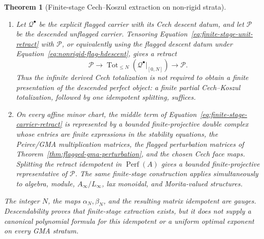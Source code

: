 \documentclass[11pt]{article}
\newtheorem{theorem}{Theorem}[section]
\theoremstyle{definition}
\begin{document}
\begin{theorem}[Finite-stage Cech--Koszul extraction on non-rigid strata]
\begin{enumerate}[label=\textnormal{(\roman*)}]
\item Let $\mathcal Q^\bullet$ be the explicit flagged carrier with its Cech
descent datum, and let $\mathcal P$ be the descended unflagged carrier.  Tensoring
Equation~\eqref{eq:finite-stage-unit-retract} with $\mathcal P$, or equivalently
using the flagged descent datum under
Equation~\eqref{eq:nonrigid-flag-hdescent}, gives a retract
\begin{equation}\label{eq:finite-stage-carrier-retract}
 \mathcal P
 \longrightarrow
 \operatorname{Tot}_{\le N}
 \left(\mathcal Q^\bullet|_{[0,N]}\right)
 \longrightarrow
 \mathcal P.
\end{equation}
Thus the infinite derived Cech totalization is not required to obtain a finite
presentation of the descended perfect object: a finite partial
Cech--Koszul totalization, followed by one idempotent splitting, suffices.

\item On every affine minor chart, the middle term of
Equation~\eqref{eq:finite-stage-carrier-retract} is represented by a bounded
finite-projective double complex whose entries are finite expressions in the
stability equations, the Peirce/GMA multiplication matrices, the flagged
perturbation matrices of Theorem~\ref{thm:flagged-gma-perturbation}, and the
chosen Cech face maps.  Splitting the retract idempotent in
$\operatorname{Perf}(A)$ gives a bounded finite-projective representative of
$\mathcal P$.  The same finite-stage construction applies simultaneously to
algebra, module, $A_\infty/L_\infty$, lax monoidal, and Morita-valued
structures.
\end{enumerate}

The integer $N$, the maps $\alpha_N,\beta_N$, and the resulting matrix
idempotent are gauges.  Descendability proves that finite-stage extraction
exists, but it does not supply a canonical polynomial formula for this
idempotent or a uniform optimal exponent on every GMA stratum.
\end{theorem}
\end{document}

